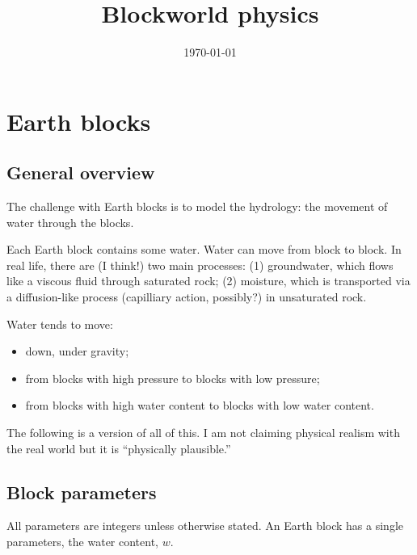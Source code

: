 \documentclass[10pt, a4paper, twocolumn]{article}
\title{Blockworld physics}
\author{}
\date{\today}
\begin{document}
\maketitle

\section{Earth blocks}

\subsection{General overview}

The challenge with Earth blocks is to model the hydrology: the
movement of water through the blocks.

Each Earth block contains some water. Water can move from block to
block. In real life, there are (I think!) two main processes: (1)
groundwater, which flows like a viscous fluid through saturated rock;
(2) moisture, which is transported via a diffusion-like process
(capilliary action, possibly?) in unsaturated rock.

Water tends to move:
\begin{itemize}
\item down, under gravity; 
\item from blocks with high pressure to blocks with low pressure; 
\item from blocks with high water content to blocks with low water
  content.
\end{itemize}

The following is a version of all of this. I am not claiming physical
realism with the real world but it is “physically plausible.”

\subsection{Block parameters}

All parameters are integers unless otherwise stated. An Earth block
has a single parameters, the water content, $w$.
\end{document}

